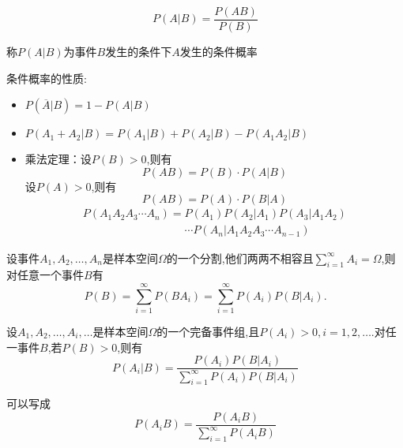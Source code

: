\begin{definition}[条件概率]
    \[P(A\vert B)=\frac{P(AB)}{P(B)}\]

    称$P(A\vert B)$为事件$B$发生的条件下$A$发生的条件概率
\end{definition}

条件概率的性质:
    \begin{itemize}
    \item $P(\overline{A}\vert B)=1-P(A\vert B)$
    \item $P(A_1+A_2\vert B)=P(A_1\vert B)+P(A_2\vert B)-P(A_1A_2\vert B)$
    \item 乘法定理：设$P(B)>0$,则有
    \[P(AB)=P(B)\cdot P(A\vert B)\]
    设$P(A)>0$,则有
    \[P(AB)=P(A)\cdot P(B\vert A)\]
        \begin{gather*}
            P(A_1A_2A_3\cdots A_n)=P(A_1)P(A_2\vert A_1)P(A_3\vert A_1A_2)\\
            \phantom{P(A_1A_2A_3\cdots A_n)=}\cdots P(A_n\vert A_1A_2A_3\cdots A_{n-1})
        \end{gather*}
    \end{itemize}
\begin{ttheorem}[(全概率公式)]
    设事件$A_1,A_2,\dots,A_n$是样本空间$\varOmega $的一个分割,他们两两不相容且$\sum_{i=1}^{\infty} A_i=\varOmega$,则对任意一个事件$B$有
    \begin{equation*}
        P(B)=\sum_{i=1}^{\infty} P(BA_i)=\sum_{i=1}^{\infty} P(A_i)P(B\vert A_i).
    \end{equation*}
\end{ttheorem}
\begin{theorem}[Bayes公式]
    设$A_1,A_2,\dotsc,A_i,\dotsc$是样本空间$\varOmega $的一个完备事件组,且$P(A_i)>0,i=1,2,\dotsc$.对任一事件$B$,若$P(B)>0$,则有
    \begin{equation*}
        P(A_i\vert B)=\frac{P(A_i)P(B\vert A_i)}{\sum\limits^{\infty}_{i=1}P(A_i)P(B\vert A_i)}
    \end{equation*}

    可以写成
    \begin{equation*}
        P(A_i B)=\frac{P(A_iB)}{\sum\limits^{\infty}_{i=1}P(A_iB)}
    \end{equation*}
\end{theorem}
